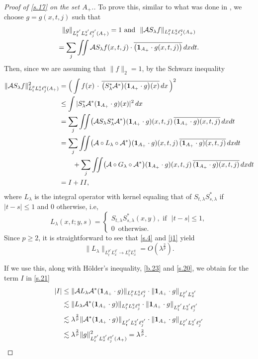 \documentclass[10pt]{amsart}
\newcommand{\la}{\lambda}
\newcommand{\1}{{\bf 1}}
\newcommand{\A}{{\mathcal A}}
\begin{document}
\begin{proof}[Proof of \eqref{s.17} on the set $A_+$.]
To prove this, similar to what was done in \cite{HSst}, we  choose $g=g(x,t,j)$ such that
\begin{multline}\label{s.20}
    \|g\|_{L^{p'}_tL^{q'}_x\ell^{q'}_j(A_+)}=1
\,\, \text{and } \, \,
\|\A S_\la f\|_{L^p_tL^q_x\ell^q_j(A_+)} \\
=\sum_j\iint \A S_\la f(x,t,j)\cdot
\overline{\bigl(\1_{A_+}\cdot g (x,t,j)\bigr)} \, dx dt.
\end{multline}
Then, since we are assuming that $\|f\|_2=1$, by
the Schwarz inequality
\begin{align}\label{s.21}
\|\A S_\la f\|^2_{L^p_tL^q_x\ell^q_j(A_+)}
&= \Bigl( \, \int f(x) \, \cdot \,  
\overline{\bigl(S_\la^*\A^*\bigr)(\1_{A_+}
\cdot g\bigr)(x)} \, dx \, \Bigr)^2
\\
&\le \int |S^*_\la \A^*(\1_{A_+}\cdot g)(x)|^2 \, dx
\notag
\\
&=\sum_j\iint \bigl(\A S_\la S^*_\la \A^*\bigr)(\1_{A_+}\cdot
g)(x,t,j) \, \overline{(\1_{A_+}\cdot
g)(x,t,j)} \, dx dt
\notag
\\
&=\sum_j\iint \bigl(\A\circ L_\la\circ \A^*\bigr)(\1_{A_+}\cdot
g)(x,t,j) \, \overline{(\1_{A_+}\cdot
g)(x,t,j)} \, dx dt \notag
\\
&\qquad+\sum_j\iint \bigl(\A\circ G_\la\circ \A^*\bigr)(\1_{A_+}\cdot
g)(x,t,j) \, \overline{(\1_{A_+}\cdot
g)(x,t,j)} \, dx dt \notag
\\
&=I + II, \notag
\end{align}
where $L_\la$ is the integral operator with kernel equaling that of $S_{t,\la}S^*_{s,\la}$ if $|t-s|\le 1$ and 
$0$ otherwise, i.e,
\begin{equation}\label{ok}
L_\la(x,t;y,s)=
\begin{cases}S_{t,\la}S^*_{s,\la}(x,y), \, \,
\text{if } \, \, |t-s|\le 1,
\\
0 \, \, \, \text{otherwise}.
\end{cases}
\end{equation}
Since $p\ge 2$, it is straightforward to see that \eqref{s.4} and \eqref{j1}
yield
\begin{equation}\label{s.22}
\|L_\la \|_{L^{p'}_tL^{q'}_x \to L^p_tL^q_x}
=O(\la^{\frac 2p}).
\end{equation}


If we use this, along with H\"older's inequality, \eqref{b.23} and 
\eqref{s.20}, we obtain for the term $I$ in \eqref{s.21}
\begin{align}\label{k301}
|I|&\le \|\A L_\la \A^*(\1_{A_+}\cdot g)\|_{ L^p_tL^q_x\ell^q_j}
\cdot \| \1_{A_+}\cdot g \|_{L^{p'}_tL^{q'}_x}
\\
&\lesssim \|L_\la \A^*(\1_{A_+}\cdot g)\|_{L^p_tL^q_x\ell^{q}_j} 
\cdot
\|\1_{A_+}\cdot g \|_{L^{p'}_tL^{q'}_x\ell^{q'}_j}
\notag
\\
&\lesssim \la^{\frac2{p}} \|\A^*(\1_{A_+}\cdot g) \|_{L^{p'}_tL^{q'}_x\ell^{q'}_j}
\cdot
\|\1_{A_+}\cdot g \|_{L^{p'}_tL^{q'}_x\ell^{q'}_j}
\notag
\\
&\lesssim \la^{\frac2{p}}\|g\|^2_{L^{p'}_tL^{q'}_x\ell^{q'}_j(A_+)}
=\la^{\frac2{p}}. \notag
\end{align}



\end{proof}
\end{document}
